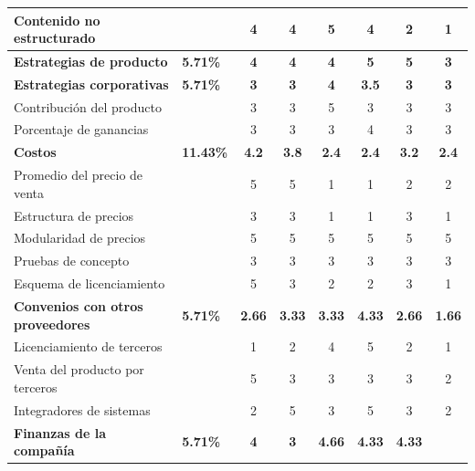 \begin{table}[htbp]
\begin{center}
{\begin{tabular}{|p{5.5cm}|>{\centering\arraybackslash}m{1.7cm}|c|c|c|c|c|c|}
        \hline
        Contenido no estructurado & & 4 & 4 & 5 & 4 & 2 & 1 \\
        \hline
        \rowcolor[gray]{0.9}\textbf{Estrategias de producto}
        & \textbf{5.71\%}
        & \textbf{4}
        & \textbf{4}
        & \textbf{4}
        & \textbf{5}
        & \textbf{5}
        & \textbf{3}\\
        \hline
        \rowcolor[gray]{0.9}\textbf{Estrategias corporativas}
        & \textbf{5.71\%}
        & \textbf{3}
        &\textbf{ 3}
        & \textbf{4}
        & \textbf{3.5}
        & \textbf{3}
        & \textbf{3}\\
        \hline
        Contribución del producto & & 3 & 3 & 5 & 3 & 3 & 3 \\
        \hline
        Porcentaje de ganancias & & 3 & 3 & 3 & 4 & 3 & 3 \\
        \hline
        \rowcolor[gray]{0.9}\textbf{Costos}
        & \textbf{11.43\%}
        & \textbf{4.2}
        & \textbf{3.8}
        & \textbf{2.4}
        & \textbf{2.4}
        & \textbf{3.2}
        & \textbf{2.4}\\
        \hline
        Promedio del precio de venta & & 5 & 5 & 1 & 1 & 2 & 2 \\
        \hline
        Estructura de precios & & 3 & 3 & 1 & 1 & 3 & 1 \\
        \hline
        Modularidad de precios & & 5 & 5 & 5 & 5 & 5 & 5 \\
        \hline
        Pruebas de concepto & & 3 & 3 & 3 & 3 & 3 & 3 \\
        \hline
        Esquema de licenciamiento & & 5 & 3 & 2 & 2 & 3 & 1 \\
        \hline
        \rowcolor[gray]{0.9}\textbf{Convenios con otros proveedores}
        & \textbf{5.71\%}
        & \textbf{2.66}
        & \textbf{3.33}
        & \textbf{3.33}
        & \textbf{4.33}
        & \textbf{2.66}
        & \textbf{1.66}\\
        \hline
        Licenciamiento de terceros & & 1 & 2 & 4 & 5 & 2 & 1 \\
        \hline
        Venta del producto por terceros & & 5 & 3 & 3 & 3 & 3 & 2 \\
        \hline
        Integradores de sistemas & & 2 & 5 & 3 & 5 & 3 & 2 \\
        \hline
        \rowcolor[gray]{0.9}\textbf{Finanzas de la compañía}
        & \textbf{5.71\%}
        & \textbf{4}
        & \textbf{3}
        & \textbf{4.66}
        & \textbf{4.33}
        & \textbf{4.33}

\end{tabular}}
\end{center}
\end{table}
